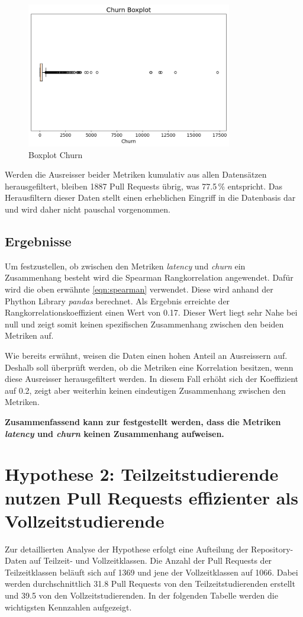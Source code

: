 \begin{figure}[htbp]
    \includegraphics[width=0.8\textwidth]{Figures/boxplot-churn.png}
      \centering
    \caption{Boxplot Churn}
    \label{fig:boxplot-churn}
\end{figure}
\newpage
Werden die Ausreisser beider Metriken kumulativ aus allen Datensätzen herausgefiltert, bleiben 1887 Pull Requests übrig, was 77.5\,\% entspricht. Das Herausfiltern dieser Daten stellt einen erheblichen Eingriff in die Datenbasis dar und wird daher nicht pauschal vorgenommen.

\subsection{Ergebnisse}
Um festzustellen, ob zwischen den Metriken \textit{latency} und \textit{churn} ein Zusammenhang besteht wird die Spearman Rangkorrelation angewendet. Dafür wird die oben erwähnte \autoref{eqn:spearman} verwendet. Diese wird anhand der Phython Library \textit{pandas} berechnet. Als Ergebnis erreichte der Rangkorrelationskoeffizient einen Wert von 0.17. Dieser Wert liegt sehr Nahe bei null und zeigt somit keinen spezifischen Zusammenhang zwischen den beiden Metriken auf. 

Wie bereits erwähnt, weisen die Daten einen hohen Anteil an Ausreissern auf. Deshalb soll überprüft werden, ob die Metriken eine Korrelation besitzen, wenn diese Ausreisser herausgefiltert werden. In diesem Fall erhöht sich der Koeffizient auf 0.2, zeigt aber weiterhin keinen eindeutigen Zusammenhang zwischen den Metriken.

\textbf{Zusammenfassend kann zur  festgestellt werden, dass die Metriken \textit{latency} und \textit{churn} keinen Zusammenhang aufweisen.}

\section{Hypothese 2: Teilzeitstudierende nutzen Pull Requests effizienter als Vollzeitstudierende}
Zur detaillierten Analyse der Hypothese erfolgt eine Aufteilung der Repository-Daten auf Teilzeit- und Vollzeitklassen. Die Anzahl der Pull Requests der Teilzeitklassen beläuft sich auf 1369 und jene der Vollzeitklassen auf 1066. Dabei werden durchschnittlich 31.8 Pull Requests von den Teilzeitstudierenden erstellt und 39.5 von den Vollzeitstudierenden. In der folgenden Tabelle werden die wichtigsten Kennzahlen aufgezeigt.

